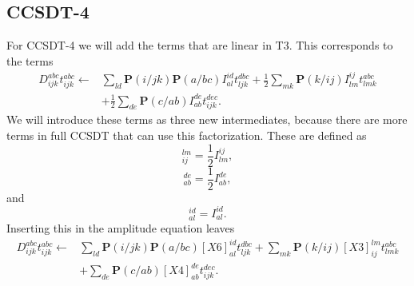 \documentclass[graybox,sectrefs,envcountresetchap,open=right]{svmonodo}
\begin{document}
\subsection{CCSDT-4}
For CCSDT-4 we will add the terms that are linear in T3. This corresponds to the terms
\begin{align}
D_{ijk}^{abc} t_{ijk}^{abc} \leftarrow &
\sum _{ld}
\mathbf{P}(i/jk) \mathbf{P}(a/bc) 
I_{al}^{id} t^{dbc}_{ljk}
+
\frac{1}{2} \sum_{mk}
\mathbf{P}(k/ij) I_{lm}^{ij} t_{lmk}^{abc}
\nonumber \\ &
+
\frac{1}{2} \sum_{de} 
\mathbf{P}(c/ab) I_{ab}^{de} t^{dec}_{ijk} .
\end{align}
We will introduce these terms as three new intermediates, because there are more terms in full CCSDT that can use this factorization. These are defined as
\begin{equation}
[X3]_{ij}^{lm} = \frac{1}{2} I_{lm}^{ij} ,
\end{equation}
\begin{equation}
[X4]_{ab}^{de} = \frac{1}{2} I_{ab}^{de} ,
\end{equation}
and
\begin{equation}
[X6]_{al}^{id} = I_{al}^{id} .
\end{equation}
Inserting this in the amplitude equation leaves
\begin{align}
D_{ijk}^{abc} t_{ijk}^{abc} \leftarrow &
\sum _{ld}
\mathbf{P}(i/jk) \mathbf{P}(a/bc) 
[X6]_{al}^{id} t^{dbc}_{ljk}
+
 \sum_{mk}
\mathbf{P}(k/ij) [X3]_{ij}^{lm} t_{lmk}^{abc}
\nonumber \\ &
+
\sum_{de}
\mathbf{P}(c/ab)[X4]_{ab}^{de}  t^{dec}_{ijk} .
\end{align}
\end{document}
